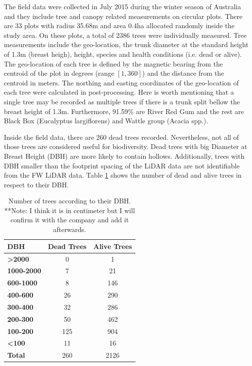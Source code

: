 \documentclass{subfiles}
\begin{document}
\par The field data were collected in July 2015 during the winter season of Australia and they include tree and canopy related measurements on circular plots. There are 33 plots with radius 35.68m and area 0.4ha  allocated randomly inside the study area. On these plots, a total of 2386 trees were individually measured.  Tree measurements include the geo-location, the trunk diameter at the standard height of 1.3m (breast heigh), height, species and health conditions (i.e. dead or alive). The geo-location of each tree is defined by the magnetic bearing from the centroid of the plot in degrees (range $[1,360]$) and the distance from the centroid in meters. The northing and easting coordinates of the geo-location of each tree were calculated in post-processing. Here is worth mentioning that a single tree may be recorded as multiple trees if there is a trunk split bellow the breast height of 1.3m. Furthermore, 91.59\% are River Red Gum and the rest are Black Box (Eucalyptus largiflorens) and Wattle group (Acacia spp.). 

\par Inside the field data, there are 260 dead trees recorded. Nevertheless, not all of those trees are considered useful for biodiversity. Dead trees with big Diameter at Breast Height (DBH) are more likely to contain hollows. Additionally, trees with DBH smaller than the footprint spacing of the LiDAR data are not identifiable from the FW LiDAR data. Table \ref{tab:DBH} shows the number of dead and alive trees in respect to their DBH. 

\begin{table}[!h]
	\centering
	\begin{tabular}{| l || c | c | }
		\hline		
		\textbf{DBH} &\textbf{Dead Trees} & \textbf{Alive Trees }\\	
		\hline			
		\hline			
		\textbf{>2000} & 0 & 1\\
		\hline			
		\textbf{1000-2000} & 7 & 21\\
		\hline			
		\textbf{600-1000} & 8 & 146\\
		\hline			
		\textbf{400-600} & 26 & 290\\
		\hline			
		\textbf{300-400} & 32 & 286\\
		\hline			
		\textbf{200-300} & 50 & 462\\
		\hline			
		\textbf{100-200} &125 & 904\\
		\hline			
		\textbf{<100} & 11 & 16\\
		\hline			
		\textbf{Total} & 260 & 2126 \\
		\hline  
	\end{tabular}
	\caption{Number of trees according to their DBH. {\color{red}**Note: I think it is in centimeter but I will confirm it with the company and add it afterwards. }}
	\label{tab:DBH}
\end{table}
\end{document}
